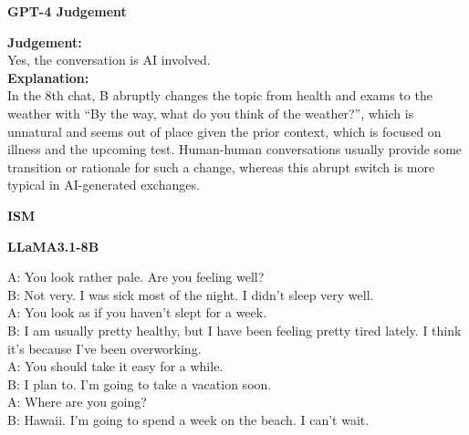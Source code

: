 \documentclass[25pt, a0paper, portrait]{tikzposter}
\begin{document}
\begin{columns}
{\begin{center}
\begin{minipage}[t]{0.485\linewidth}
\begin{caseouterbox}
						\begin{casejudgebox}
							\begin{center}
								\textcolor{CaseGreen}{\textbf{GPT-4 Judgement}}
							\end{center}
							\textcolor{CaseBlue}{\textbf{Judgement:}}\\
							Yes, the conversation is AI involved.\\
							\textcolor{CaseBlue}{\textbf{Explanation:}}\\
							In the 8th chat, B abruptly changes the topic from health and exams to the weather with ``By the way, what do you think of the weather?'', which is unnatural and seems out of place given the prior context, which is focused on illness and the upcoming test. Human-human conversations usually provide some transition or rationale for such a change, whereas this abrupt switch is more typical in AI-generated exchanges.
						\end{casejudgebox}
					\end{caseouterbox}
				\end{minipage}\hfill
				\begin{minipage}[t]{0.485\linewidth}
					\begin{caseouterbox}
						\begin{center}
							\textbf{\Large ISM}
						\end{center}
						\begin{casedialogbox}
							\begin{center}
								\textcolor{CaseGreen}{\textbf{LLaMA3.1-8B}}
							\end{center}
							A: You look rather pale. Are you feeling well?\\
							B: Not very. I was sick most of the night. I didn't sleep very well.\\
							A: You look as if you haven't slept for a week.\\
							B: I am usually pretty healthy, but I have been feeling pretty tired lately. I think it's because I've been overworking.\\
							A: You should take it easy for a while.\\
							B: I plan to. I'm going to take a vacation soon.\\
							A: Where are you going?\\
							B: Hawaii. I'm going to spend a week on the beach. I can't wait.
						\end{casedialogbox}
						

\end{caseouterbox}
\end{minipage}
\end{center}}
\end{columns}
\end{document}
